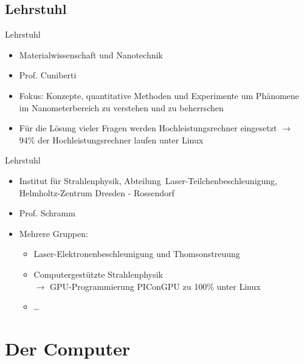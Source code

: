 \documentclass[aspectratio=43]{beamer}
\begin{document}
\subsection{Lehrstuhl}

\begin{frame}
	\begin{block}{Lehrstuhl} 
	\begin{itemize}
	\item Materialwissenschaft und Nanotechnik  
	\item Prof. Cuniberti
	\item Fokus: Konzepte, quantitative Methoden und Experimente um Phänomene im Nanometerbereich zu verstehen und zu beherrschen
	\item Für die Lösung vieler Fragen werden Hochleistungsrechner eingesetzt  $\rightarrow$ 94\% der Hochleistungsrechner laufen unter Linux
	\end{itemize}
	\end{block}
	
\end{frame}

\begin{frame}
	\begin{block}{Lehrstuhl} 
	\begin{itemize}
	\item Institut für Strahlenphysik, Abteilung~Laser-Teilchenbeschleunigung, Helmholtz-Zentrum Dresden - Rossendorf  
	\item Prof. Schramm
	\item Mehrere Gruppen:
	\begin{itemize}
	 \item Laser-Elektronenbeschleunigung und Thomsonstreuung
	 \item Computergestützte Strahlenphysik \\ $\rightarrow$ GPU-Programmierung PIConGPU zu 100\% unter Linux
	 \item \dots
	\end{itemize}
	\end{itemize}
	\end{block}
	
\end{frame}

\section{Der Computer}
\end{document}
